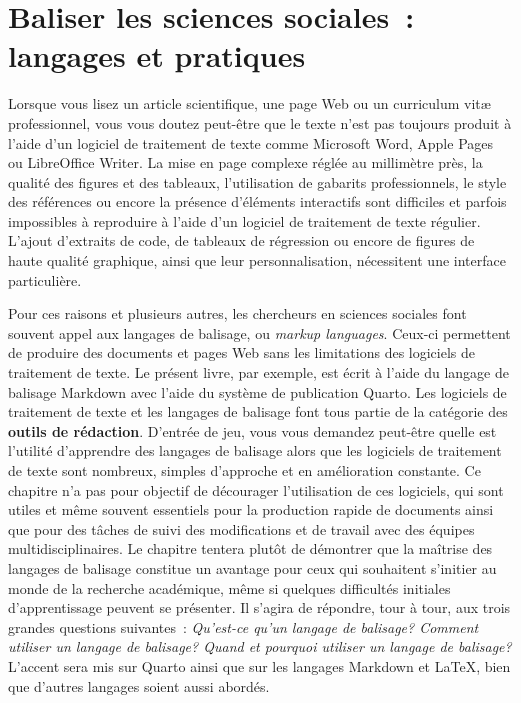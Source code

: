 \documentclass[
  letterpaper,
  DIV=11,
  numbers=noendperiod]{scrreprt}
\begin{document}

\hypertarget{sec-chap7}{%
\chapter{Baliser les sciences sociales~: langages et
pratiques}\label{sec-chap7}}

Lorsque vous lisez un article scientifique, une page Web ou un
curriculum vitæ professionnel, vous vous doutez peut-être que le texte
n'est pas toujours produit à l'aide d'un logiciel de traitement de texte
comme Microsoft Word, Apple Pages ou LibreOffice Writer. La mise en page
complexe réglée au millimètre près, la qualité des figures et des
tableaux, l'utilisation de gabarits professionnels, le style des
références ou encore la présence d'éléments interactifs sont difficiles
et parfois impossibles à reproduire à l'aide d'un logiciel de traitement
de texte régulier. L'ajout d'extraits de code, de tableaux de régression
ou encore de figures de haute qualité graphique, ainsi que leur
personnalisation, nécessitent une interface particulière.

Pour ces raisons et plusieurs autres, les chercheurs en sciences
sociales font souvent appel aux langages de balisage, ou \emph{markup
languages}. Ceux-ci permettent de produire des documents et pages Web
sans les limitations des logiciels de traitement de texte. Le présent
livre, par exemple, est écrit à l'aide du langage de balisage Markdown
avec l'aide du système de publication Quarto. Les logiciels de
traitement de texte et les langages de balisage font tous partie de la
catégorie des \textbf{outils de rédaction}. D'entrée de jeu, vous vous
demandez peut-être quelle est l'utilité d'apprendre des langages de
balisage alors que les logiciels de traitement de texte sont nombreux,
simples d'approche et en amélioration constante. Ce chapitre n'a pas
pour objectif de décourager l'utilisation de ces logiciels, qui sont
utiles et même souvent essentiels pour la production rapide de documents
ainsi que pour des tâches de suivi des modifications et de travail avec
des équipes multidisciplinaires. Le chapitre tentera plutôt de démontrer
que la maîtrise des langages de balisage constitue un avantage pour ceux
qui souhaitent s'initier au monde de la recherche académique, même si
quelques difficultés initiales d'apprentissage peuvent se présenter. Il
s'agira de répondre, tour à tour, aux trois grandes questions
suivantes~: \emph{Qu'est-ce qu'un langage de balisage? Comment utiliser
un langage de balisage? Quand et pourquoi utiliser un langage de
balisage?} L'accent sera mis sur Quarto ainsi que sur les langages
Markdown et \LaTeX, bien que d'autres langages soient aussi abordés.
\end{document}
